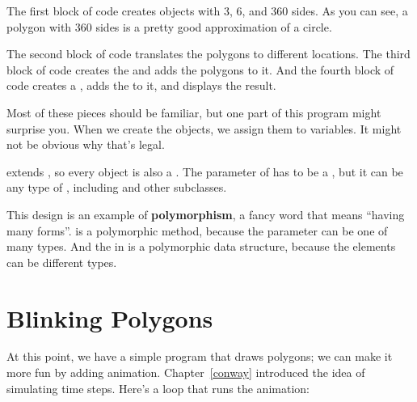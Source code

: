 The first block of code creates  objects with 3, 6, and 360 sides.
As you can see, a polygon with 360 sides is a pretty good approximation of a circle.

The second block of code translates the polygons to different locations.
The third block of code creates the  and adds the polygons to it.
And the fourth block of code creates a , adds the  to it, and displays the result.

Most of these pieces should be familiar, but one part of this program might surprise you.
When we create the  objects, we assign them to  variables.
It might not be obvious why that's legal.


 extends , so every  object is also a .
The parameter of  has to be a , but it can be any type of , including  and other subclasses.


This design is an example of {\bf polymorphism}, a fancy word that means ``having many forms''.
 is a polymorphic method, because the parameter can be one of many types.
And the  in  is a polymorphic data structure, because the elements can be different types.




\section{Blinking Polygons}

At this point, we have a simple program that draws polygons; we can make it more fun by adding animation.
Chapter~\ref{conway} introduced the idea of simulating time steps.
Here's a loop that runs the animation:

